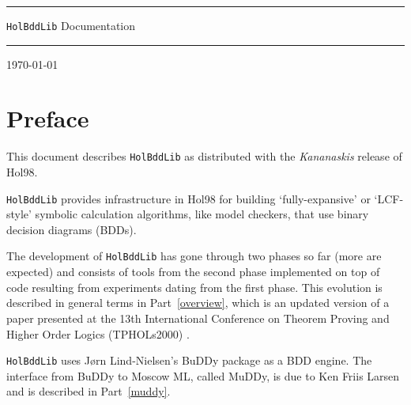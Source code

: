 \documentclass[12pt]{article}
\newcommand{\Buddy}{BuDDy\xspace}
\newcommand{\Muddy}{MuDDy\xspace}
\begin{document}
\thispagestyle{empty}

\hrule height5pt

\begin{flushleft}\Huge
{\tt HolBddLib} Documentation
\end{flushleft}

\vspace*{2mm}

\hrule height5pt

\vspace*{1cm}



\vspace*{5mm}

\today

\vfill

{\setlength{\fboxrule}{0.5mm}
\setlength{\fboxsep}{2mm}
}

\vfill

\newpage


\section*{Preface}



This document describes {\tt{HolBddLib}}
as distributed with the {\it Kananaskis\/} release of Hol98.

{\tt{HolBddLib}} provides infrastructure in Hol98 for building 
`fully-expansive' or `LCF-style' symbolic calculation algorithms, like model
checkers, that use binary decision diagrams (BDDs). 

The development of {\tt HolBddLib} has gone through two phases so far
(more are expected) and consists of tools
from the second phase implemented on top of code resulting from
experiments dating from the first phase.  This evolution is described in
general terms in Part~\ref{overview}, which is an updated version of a
paper presented at the 13th International Conference on Theorem
Proving and Higher Order Logics (TPHOLs2000) \cite{Gordon:TPHOLs2000}.

{\tt HolBddLib} uses J{\o}rn Lind-Nielsen's \Buddy{} package as a BDD
engine. The interface from \Buddy{} to Moscow ML, called \Muddy, is
due to Ken Friis Larsen and is described in Part~\ref{muddy}.
\end{document}
